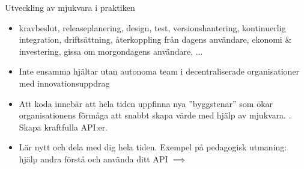 \begin{Slide}{Utveckling av mjukvara i praktiken}
\begin{itemize}
\item {} kravbeslut, releaseplanering, design, test, versionshantering, kontinuerlig integration, driftsättning, återkoppling från dagens användare, ekonomi \& investering, gissa om morgondagens användare, ...
\item {} Inte ensamma hjältar utan autonoma team i decentraliserade organisationer med innovationsuppdrag
\item {} Att koda innebär att hela tiden uppfinna nya ''byggstenar'' som ökar organisationens förmåga att snabbt skapa värde med hjälp av mjukvara. . Skapa kraftfulla API:er.
\item {} Lär nytt och dela med dig hela tiden. Exempel på pedagogisk utmaning: hjälp andra förstå och använda ditt API $\implies$ 
\end{itemize}
\end{Slide}


\fi %


\ifkompendium\else
{}
\fi


\ifkompendium\else
{}
\fi

